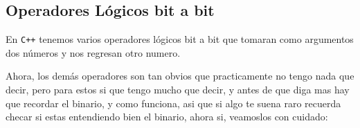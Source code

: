 \documentclass[12pt, fleqn]{report}                             %
\theoremstyle{break}                                            %
\newcommand{\textCode}[1]  { \texttt{#1} }                      %
\newcommand{\Cpp}{\ignorespaces\textCode{C++}}                  %
\begin{document}
            \subsection{Operadores Lógicos bit a bit}

                En \Cpp tenemos varios operadores lógicos bit a bit que tomaran como argumentos dos números 
                y nos regresan otro numero.

                Ahora, los demás operadores son tan obvios que practicamente no tengo nada que decir, pero para estos si que tengo
                mucho que decir, y antes de que diga mas hay que recordar el binario, y como funciona, 
                asi que si algo te suena raro recuerda checar si estas entendiendo bien el binario, ahora si, 
                veamoslos con cuidado:
\end{document}
